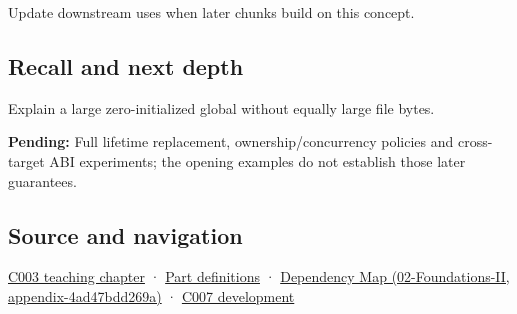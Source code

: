 Update downstream uses when later chunks build on this concept.

\subsection{Recall and next depth}\label{appendix-17c93c4c2f19-recall-and-next-depth}

Explain a large zero-initialized global without equally large file bytes.

\textbf{Pending:} Full lifetime replacement, ownership/concurrency policies and cross-target ABI experiments; the opening examples do not establish those later guarantees.

\subsection{Source and navigation}\label{appendix-17c93c4c2f19-source-and-navigation}

\hyperref[01-foundations-i-ch002-where-the-bytes-live]{C003 teaching chapter} · \hyperref[appendix-fd090d982a15-m003---parts-41-60]{Part definitions} · \href{../02-Foundations-II/main.pdf\#nameddest=appendix-4ad47bdd269a}{Dependency Map (02-Foundations-II, appendix-4ad47bdd269a)} · \hyperref[01-foundations-i-ch002-a-name-does-not-decide-how-long-storage-lasts]{C007 development}
